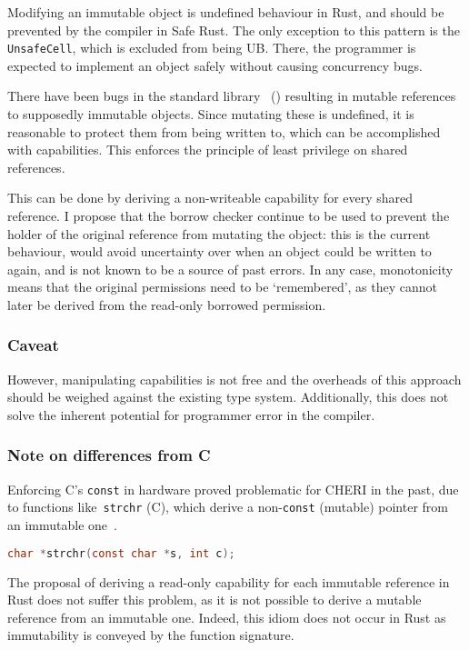 \documentclass[dissertation.tex]{subfiles}
\begin{document}
Modifying an immutable object is undefined behaviour in Rust, and should
be prevented by the compiler in Safe Rust.
The only exception to this pattern is the \texttt{UnsafeCell}, which is
excluded from being UB.
There, the programmer is expected to implement an object safely without
causing concurrency bugs.

There have been bugs in the standard library~\cite{rust-issue-vec-mut}
() resulting in mutable references to
supposedly immutable objects.
Since mutating these is undefined, it is reasonable to protect them
from being written to, which can be accomplished with capabilities.
This enforces the principle of least privilege on shared references.

This can be done by deriving a non-writeable capability for every shared
reference.
I propose that the borrow checker continue to be used to prevent the
holder of the original reference from mutating the object: this is the
current behaviour, would avoid uncertainty over when an object could be
written to again, and is not known to be a source of past errors.
In any case, monotonicity means that the original permissions need to be
`remembered', as they cannot later be derived from the read-only
borrowed permission.

\subsubsection{Caveat}
However, manipulating capabilities is not free and the overheads of this
approach should be weighed against the existing type system.
Additionally, this does not solve the inherent potential for programmer
error in the compiler.

\subsubsection{Note on differences from C}
Enforcing C's \texttt{const} in hardware proved problematic for CHERI in
the past, due to functions like~\texttt{strchr} (C), which derive a
non-\texttt{const} (mutable) pointer from an immutable
one~\cite{cheri-prog-guide}.

\begin{lstlisting}[language=C]
char *strchr(const char *s, int c);
\end{lstlisting}

The proposal of deriving a read-only capability for each immutable
reference in Rust does not suffer this problem, as it is not possible to
derive a mutable reference from an immutable one.
Indeed, this idiom does not occur in Rust as immutability is conveyed by
the function signature.
\end{document}
